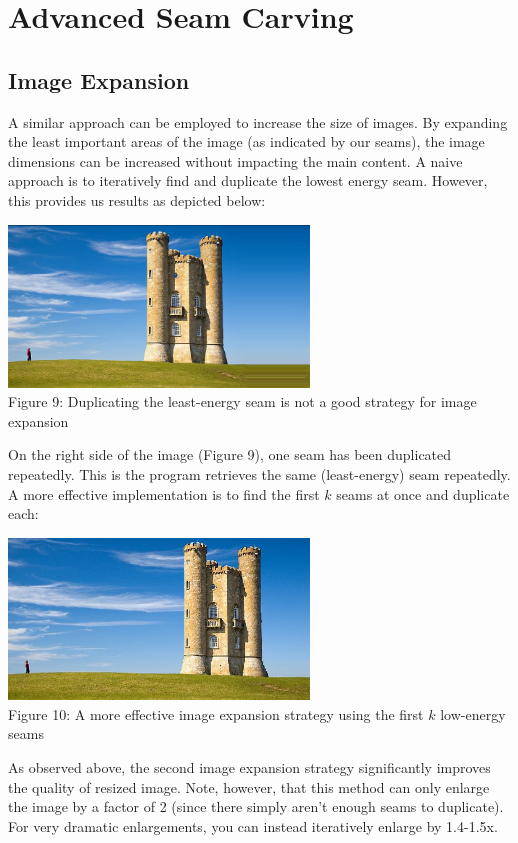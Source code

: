 \documentclass{article}
\begin{document}
\section{Advanced Seam Carving}
\subsection{Image Expansion}
A similar approach can be employed to increase the size of images. By expanding the least important areas of the image (as indicated by our seams), the image dimensions can be increased without impacting the main content. A naive approach is to iteratively find and duplicate the lowest energy seam. However, this provides us results as depicted below:

\begin{center}
\includegraphics[width=8cm]{Naive_Castle_Resizing.jpg} \\
Figure 9: Duplicating the least-energy seam is not a good strategy for image expansion \cite{castle}
\end{center}
On the right side of the image (Figure 9), one seam has been duplicated repeatedly. This is the program retrieves the same (least-energy) seam repeatedly. A more effective implementation is to find the first $k$ seams at once and duplicate each:

\begin{center}
\includegraphics[width=8cm]{Smart_Resizing.jpg} \\
Figure 10: A more effective image expansion strategy using the first $k$ low-energy seams \cite{castle2}
\end{center}
As observed above, the second image expansion strategy significantly improves the quality of resized image. Note, however, that this method can only enlarge the image by a factor of 2 (since there simply aren't enough seams to duplicate). For very dramatic enlargements, you can instead iteratively enlarge by 1.4-1.5x.
\end{document}
